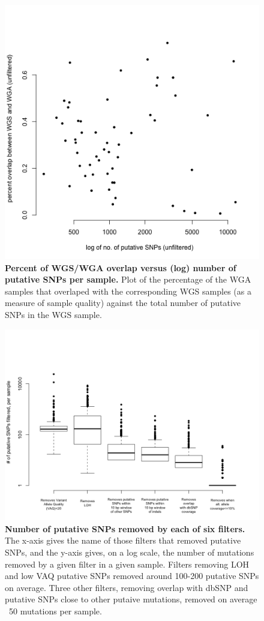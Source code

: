 \documentclass[11pt]{article} %
\begin{document}
\begin{figure}
\includegraphics[scale=1.0]{unfiltered_total_muts_v_percent_overlap.png}
\caption{\textbf{Percent of WGS/WGA overlap versus (log) number of putative SNPs per sample.} Plot of the percentage of the WGA samples that overlaped with the corresponding WGS samples (as a measure of sample quality) against the total number of putative SNPs in the WGS sample.}
\end{figure}

\begin{figure}
\includegraphics[scale=1.0]{boxplot_number_filtered.png}
\caption{\textbf{Number of putative SNPs removed by each of six filters.} The x-axis gives the name of those filters that removed putative SNPs, and the y-axis gives, on a log scale, the number of mutations removed by a given filter in a given sample. Filters removing LOH and low VAQ putative SNPs removed around 100-200 putative SNPs on average. Three other filters, removing overlap with dbSNP and putative SNPs close to other putaive mutations, removed on average ~50 mutations per sample.}
\end{figure}
\end{document}
